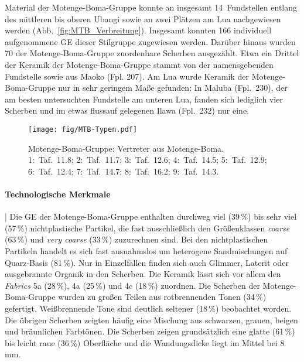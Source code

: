 Material der Motenge-Boma-Gruppe konnte an insgesamt 14~Fundstellen entlang des mittleren bis oberen \mbox{Ubangi} sowie an zwei Plätzen am Lua nachgewiesen werden (Abb.~\ref{fig:MTB_Verbreitung}). Insgesamt konnten 166 individuell aufgenommene GE dieser Stilgruppe zugewiesen werden. Darüber hinaus wurden 70 der Motenge-Boma-Gruppe zuordenbare Scherben ausgezählt. Etwa ein Drittel der Keramik der Motenge-Boma-Gruppe stammt von der namensgebenden Fundstelle sowie aus Maoko (Fpl. 207). Am Lua wurde Keramik der Motenge-Boma-Gruppe nur in sehr geringem Maße gefunden: In Maluba (Fpl.~230), der am besten untersuchten Fundstelle am unteren Lua, fanden sich lediglich vier Scherben und im etwas flussauf gelegenen Ilawa (Fpl.~232) nur eine.

\begin{figure*}[!tb]
	\centering
	\texttt{[image: fig/MTB-Typen.pdf]}
	\caption{Motenge-Boma-Gruppe: Vertreter aus Motenge-Boma.\\1:~Taf.~11.8; 2:~Taf.~11.7; 3:~Taf.~12.6; 4:~Taf.~14.5; 5:~Taf.~12.9; 6:~Taf.~12.4; 7:~Taf.~14.7; 8:~Taf.~16.2; 9:~Taf.~14.3.}
	\label{fig:MTB_Typvertreter}
\end{figure*}

\paragraph{Technologische Merkmale}\hspace{-.5em}|\hspace{.5em}%
Die GE der Motenge-Boma-Gruppe enthalten durchweg viel (39\,\%) bis sehr viel (57\,\%) nichtplastische Partikel, die fast ausschließlich den Größenklassen \textit{coarse} (63\,\%) und \textit{very coarse} (33\,\%) zuzurechnen sind. Bei den nichtplastischen Partikeln handelt es sich fast ausnahmslos um heterogene Sandmischungen auf Quarz-Basis (81\,\%). Nur in Einzelfällen finden sich auch Glimmer, Laterit oder ausgebrannte Organik in den Scherben. Die Keramik lässt sich vor allem den \textit{Fabrics} 5a (28\,\%), 4a (25\,\%) und 4c (18\,\%) zuordnen. Die Scherben der Motenge-Boma-Gruppe wurden zu großen Teilen aus rotbrennenden Tonen (34\,\%) gefertigt. Weißbrennende Tone sind deutlich seltener (18\,\%) beobachtet worden. Die übrigen Scherben zeigten häufig eine Mischung aus schwarzen, grauen, beigen und bräunlichen Farbtönen. Die Scherben zeigen grundsätzlich eine glatte (61\,\%) bis leicht raue (36\,\%) Oberfläche und die Wandungsdicke liegt im Mittel bei 8\,mm.


